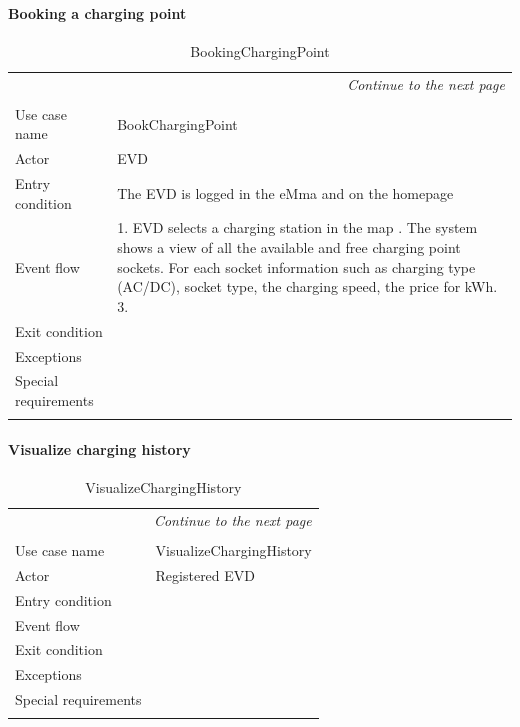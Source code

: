 \paragraph{Booking a charging point}
\begin{center}
    \begin{longtable}{p{4cm} p{11cm}}
    \multicolumn{2}{r}{\itshape{Continue to the next page}}\\
    \endfoot 
    \\
    \endlastfoot
    \hline
     Use case name &  BookChargingPoint\\
     \hline
     Actor & EVD \\
     \hline
     Entry condition &   The EVD is logged in the eMma and on the homepage\\
     \hline
     Event flow &
        1. EVD selects a charging station in the map \newline
        2. The system shows a view of all the available and free charging point sockets. For each socket information such as charging type (AC/DC), socket type, the charging speed, the price for kWh.
        3. 
        \\
     \hline
     Exit condition &  \\
     \hline
     Exceptions &  \\
     \hline
     Special requirements &  \\
     \hline
    \caption{BookingChargingPoint}
    \label{tab:BookingChargingPoint}
    \end{longtable}
\end{center}

\paragraph{Visualize charging history}
\begin{center}
    \begin{longtable}{p{4cm} p{11cm}}
    \multicolumn{2}{r}{\itshape{Continue to the next page}}\\
    \endfoot 
    \\
    \endlastfoot
    \hline
     Use case name &  VisualizeChargingHistory\\
     \hline
     Actor & Registered EVD \\
     \hline
     Entry condition &  \\
     \hline
     Event flow &  \\
     \hline
     Exit condition &  \\
     \hline
     Exceptions &  \\
     \hline
     Special requirements &  \\
     \hline
    \caption{VisualizeChargingHistory}
    \label{tab:VisualizeChargingHistory}
    \end{longtable}
\end{center}

